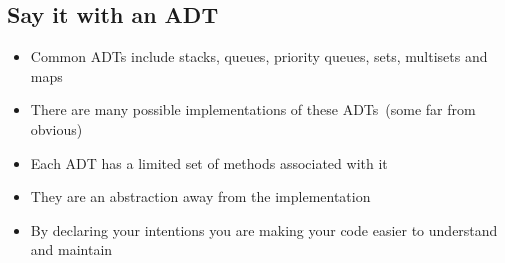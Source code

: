 
\begin{slide}
\section{Say it with an ADT}

\begin{PauseHighLight}
 \begin{itemize}
 \item Common ADTs include stacks, queues, priority queues,
   sets, multisets and maps\pause
 \item There are many possible implementations of these ADTs\pause\ (some
   far from obvious)\pause
 \item Each ADT has a limited set of methods associated with it\pause
 \item They are an abstraction away from the implementation\pause
 \item By declaring your intentions you are making your code easier to
   understand and maintain\pause
\end{itemize} 
\end{PauseHighLight}
\end{slide}


\Outline


